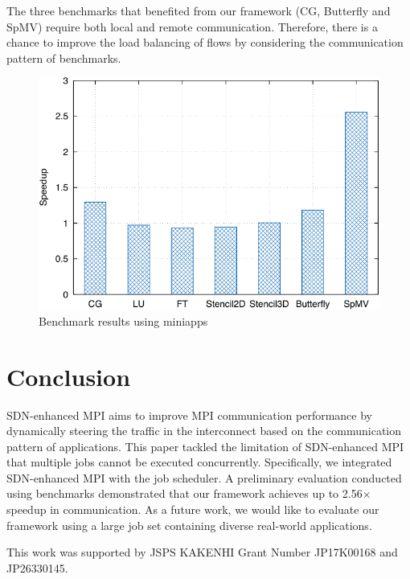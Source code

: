 \documentclass[graybox]{svmult}
\begin{document}
The three benchmarks that benefited from our framework (CG, Butterfly and
SpMV) require both local and remote communication. Therefore, there is a
chance to improve the load balancing of flows by considering the communication
pattern of benchmarks.

\begin{figure}
    \centering
    \includegraphics{benchmark_result}
    \caption{Benchmark results using miniapps}%
    \label{kt:fig:benchmark}
\end{figure}

\section{Conclusion}\label{kt:sec:v}

SDN-enhanced MPI aims to improve MPI communication performance by dynamically
steering the traffic in the interconnect based on the communication pattern of
applications. This paper tackled the limitation of SDN-enhanced MPI that
multiple jobs cannot be executed concurrently. Specifically, we integrated
SDN-enhanced MPI with the job scheduler. A preliminary evaluation conducted
using benchmarks demonstrated that our framework achieves up to 2.56$\times$
speedup in communication. As a future work, we would like to evaluate our
framework using a large job set containing diverse real-world applications.

\begin{acknowledgement}
This work was supported by JSPS KAKENHI Grant Number JP17K00168 and JP26330145.
\end{acknowledgement}



\end{document}
